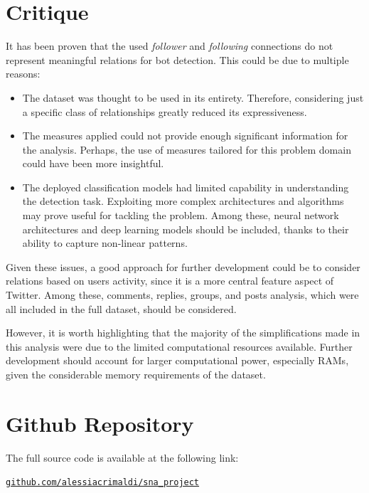 \documentclass[12pt, a4paper]{article}
\begin{document}
\section{Critique} \label{critique}
	It has been proven that the used \textit{follower} and \textit{following} connections do not represent meaningful relations for bot detection. This could be due to multiple reasons:
	\begin{itemize}
		\item The dataset was thought to be used in its entirety. Therefore, considering just a specific class of relationships greatly reduced its expressiveness.
		\item The measures applied could not provide enough significant information for the analysis. Perhaps, the use of measures tailored for this problem domain could have been more insightful.
		\item The deployed classification models had limited capability in understanding the detection task. Exploiting more complex architectures and algorithms may prove useful for tackling the problem. Among these, neural network architectures and deep learning models should be included, thanks to their ability to capture non-linear patterns.
	\end{itemize}
	Given these issues, a good approach for further development could be to consider relations based on users activity, since it is a more central feature aspect of Twitter. Among these, comments, replies, groups, and posts analysis, which were all included in the full dataset, should be considered.
	\vspace{0.2cm}
	
	However, it is worth highlighting that the majority of the simplifications made in this analysis were due to the limited computational resources available. Further development should account for larger computational power, especially RAMs, given the considerable memory requirements of the dataset.
	
	
\newpage




\newpage
\appendix
\section{Github Repository}
	The full source code is available at the following link:
	
	\href{https://github.com/alessiacrimaldi/sna_project}{\texttt{github.com/alessiacrimaldi/sna\_project}}
\end{document}
